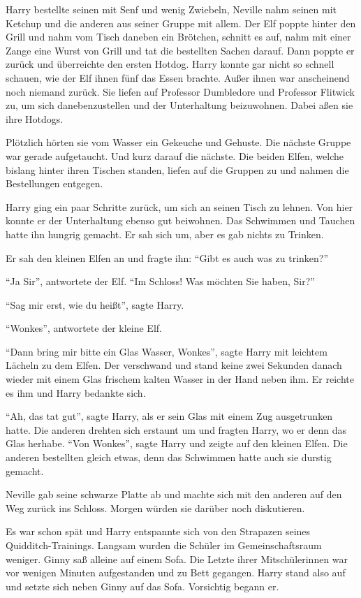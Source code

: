Harry bestellte seinen mit Senf und wenig Zwiebeln, Neville nahm seinen mit Ketchup und die anderen aus seiner Gruppe mit allem. Der Elf poppte hinter den Grill und nahm vom Tisch daneben ein Brötchen, schnitt es auf, nahm mit einer Zange eine Wurst von Grill und tat die bestellten Sachen darauf. Dann poppte er zurück und überreichte den ersten Hotdog. Harry konnte gar nicht so schnell schauen, wie der Elf ihnen fünf das Essen brachte. Außer ihnen war anscheinend noch niemand zurück. Sie liefen auf Professor Dumbledore und Professor Flitwick zu, um sich danebenzustellen und der Unterhaltung beizuwohnen. Dabei aßen sie ihre Hotdogs.

Plötzlich hörten sie vom Wasser ein Gekeuche und Gehuste. Die nächste Gruppe war gerade aufgetaucht. Und kurz darauf die nächste. Die beiden Elfen, welche bislang hinter ihren Tischen standen, liefen auf die Gruppen zu und nahmen die Bestellungen entgegen.

Harry ging ein paar Schritte zurück, um sich an seinen Tisch zu lehnen. Von hier konnte er der Unterhaltung ebenso gut beiwohnen. Das Schwimmen und Tauchen hatte ihn hungrig gemacht. Er sah sich um, aber es gab nichts zu Trinken.

Er sah den kleinen Elfen an und fragte ihn: \enquote{Gibt es auch was zu trinken?}

\enquote{Ja Sir}, antwortete der Elf. \enquote{Im Schloss! Was möchten Sie haben, Sir?}

\enquote{Sag mir erst, wie du heißt}, sagte Harry.

\enquote{Wonkes}, antwortete der kleine Elf.

\enquote{Dann bring mir bitte ein Glas Wasser, Wonkes}, sagte Harry mit leichtem Lächeln zu dem Elfen. Der verschwand und stand keine zwei Sekunden danach wieder mit einem Glas frischem kalten Wasser in der Hand neben ihm. Er reichte es ihm und Harry bedankte sich.

\enquote{Ah, das tat gut}, sagte Harry, als er sein Glas mit einem Zug ausgetrunken hatte. Die anderen drehten sich erstaunt um und fragten Harry, wo er denn das Glas herhabe. \enquote{Von Wonkes}, sagte Harry und zeigte auf den kleinen Elfen. Die anderen bestellten gleich etwas, denn das Schwimmen hatte auch sie durstig gemacht.

Neville gab seine schwarze Platte ab und machte sich mit den anderen auf den Weg zurück ins Schloss. Morgen würden sie darüber noch diskutieren.

\trenn

Es war schon spät und Harry entspannte sich von den Strapazen seines Quidditch-Trainings. Langsam wurden die Schüler im Gemeinschaftsraum weniger. Ginny saß alleine auf einem Sofa. Die Letzte ihrer Mitschülerinnen war vor wenigen Minuten aufgestanden und zu Bett gegangen. Harry stand also auf und setzte sich neben Ginny auf das Sofa. Vorsichtig begann er.

